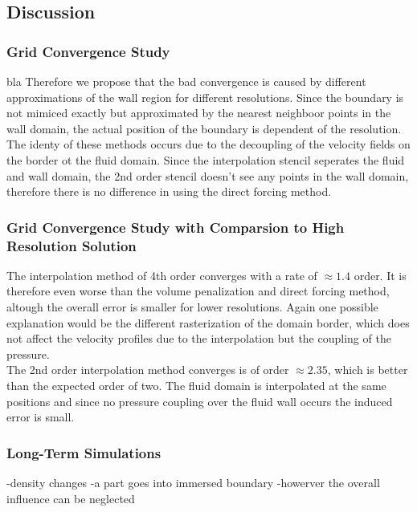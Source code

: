 \clearpage

\subsection{Discussion}
\subsubsection{Grid Convergence Study}
bla
Therefore we propose that the bad convergence is caused by different approximations of the wall region for different resolutions.
Since the boundary is not mimiced exactly but approximated by the nearest neighboor points in the wall domain, the actual position
of the boundary is dependent of the resolution.\\


 The identy of these methods occurs due to the decoupling of the velocity fields
on the border ot the fluid domain. Since the interpolation stencil seperates the fluid and wall domain, the 2nd order
stencil doesn't see any points in the wall domain, therefore there is no difference in using the direct forcing method.\\

\subsubsection{Grid Convergence Study with Comparsion to High Resolution Solution}
\label{vali:hpflow_discussion}

The interpolation method of 4th order converges with a rate of $\approx 1.4$ order. It is therefore even worse than the volume penalization and
direct forcing method, altough the overall error is smaller for lower resolutions. Again one possible explanation would be the different rasterization
of the domain border, which does not affect the velocity profiles due to the interpolation but the coupling of the pressure.\\
The 2nd order interpolation method converges is of order $\approx 2.35$, which is better than the expected order of two.
The fluid domain is interpolated at the same positions and since no pressure coupling over the fluid wall occurs the induced error is small.

\subsubsection{Long-Term Simulations}
-density changes
-a part goes into immersed boundary
-howerver the overall influence can be neglected


